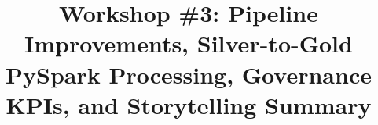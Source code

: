 \documentclass[conference]{IEEEtran}
\begin{document}
\title{Workshop \#3: Pipeline Improvements, Silver-to-Gold PySpark Processing, Governance KPIs, and Storytelling Summary}

\author{
\and
{}
\and
{}
}

\maketitle










\end{document}
